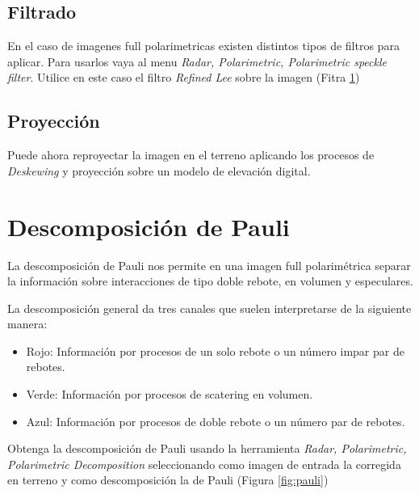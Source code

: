\subsection{Filtrado}

En el caso de imagenes full polarimetricas existen distintos tipos de filtros para aplicar. Para usarlos vaya al menu \emph{Radar, Polarimetric, Polarimetric speckle filter}. Utilice en este caso el filtro \emph{Refined Lee} sobre la imagen  (Fitra \ref{fig:plee})

\begin{figure}[h!]
    \centering
    \hfill
    \caption{}
    \label{fig:plee}
\end{figure}

\subsection{Proyección}

Puede ahora reproyectar la imagen en el terreno aplicando los procesos de \emph{Deskewing} y proyección sobre un modelo de elevación digital.

\section{Descomposición de Pauli}

La descomposición de Pauli nos permite en una imagen full polarimétrica separar la información sobre interacciones de tipo doble rebote, en volumen y especulares.

La descomposición general da tres canales que suelen interpretarse de la siguiente manera:

\begin{itemize}
    \item Rojo: Información por procesos de un solo rebote o un número impar par de rebotes.
    \item Verde: Información por procesos de scatering en volumen.
    \item Azul: Información por procesos de doble rebote o un número par de rebotes.
\end{itemize}

Obtenga la descomposición de Pauli usando la herramienta \emph{Radar, Polarimetric, Polarimetric Decomposition} seleccionando como imagen de entrada la corregida en terreno y como descomposición la de Pauli (Figura \ref{fig:pauli})

